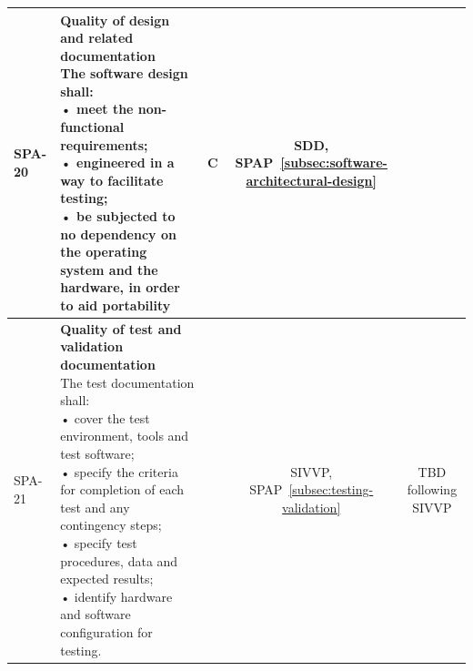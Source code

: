 {\begin{xltabular}{\textwidth}{|l|L|l|S|S|}
        SPA-20 &
        {\textbf{Quality of design and related documentation} \newline
        The software design shall: \newline
        • meet the non-functional requirements; \newline
        • engineered in a way to facilitate testing; \newline
        • be subjected to no dependency on the operating system and the hardware, in order to aid portability} &
        C &
        {SDD, \newline SPAP~\ref{subsec:software-architectural-design}} &
        \\ \hline

        SPA-21 &
        {\textbf{Quality of test and validation documentation} \newline
        The test documentation shall: \newline
        • cover the test environment, tools and test software; \newline
        • specify the criteria for completion of each test and any contingency steps; \newline
        • specify test procedures, data and expected results; \newline
        • identify hardware and software configuration for testing.} &
        &
        {SIVVP, SPAP~\ref{subsec:testing-validation}} &
        TBD following SIVVP
        \\ \hline
        
    \end{xltabular}
}

%	
%	
%	
